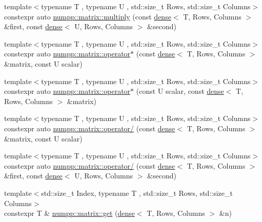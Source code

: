 \begin{DoxyCompactItemize}
\item 
{\footnotesize template$<$typename T , typename U , std\+::size\+\_\+t Rows, std\+::size\+\_\+t Columns$>$ }\\constexpr auto \hyperlink{group__numpp__structures__matrices__dense_gaeaace68ab41170931eb69e1cdb4fa381}{numpp\+::matrix\+::multiply} (const \hyperlink{classnumpp_1_1matrix_1_1dense}{dense}$<$ T, Rows, Columns $>$ \&first, const \hyperlink{classnumpp_1_1matrix_1_1dense}{dense}$<$ U, Rows, Columns $>$ \&second)
\item 
{\footnotesize template$<$typename T , typename U , std\+::size\+\_\+t Rows, std\+::size\+\_\+t Columns$>$ }\\constexpr auto \hyperlink{group__numpp__structures__matrices__dense_ga4ba3829a99216c5210cd95f49b703cf0}{numpp\+::matrix\+::operator$\ast$} (const \hyperlink{classnumpp_1_1matrix_1_1dense}{dense}$<$ T, Rows, Columns $>$ \&matrix, const U scalar)
\item 
{\footnotesize template$<$typename T , typename U , std\+::size\+\_\+t Rows, std\+::size\+\_\+t Columns$>$ }\\constexpr auto \hyperlink{group__numpp__structures__matrices__dense_ga6eabf8b5b95a1aeea6b7dc2e4344619e}{numpp\+::matrix\+::operator$\ast$} (const U scalar, const \hyperlink{classnumpp_1_1matrix_1_1dense}{dense}$<$ T, Rows, Columns $>$ \&matrix)
\item 
{\footnotesize template$<$typename T , typename U , std\+::size\+\_\+t Rows, std\+::size\+\_\+t Columns$>$ }\\constexpr auto \hyperlink{group__numpp__structures__matrices__dense_ga47bac473f5d6fe8ca8e085f8897d3f81}{numpp\+::matrix\+::operator/} (const \hyperlink{classnumpp_1_1matrix_1_1dense}{dense}$<$ T, Rows, Columns $>$ \&matrix, const U scalar)
\item 
{\footnotesize template$<$typename T , typename U , std\+::size\+\_\+t Rows, std\+::size\+\_\+t Columns$>$ }\\constexpr auto \hyperlink{group__numpp__structures__matrices__dense_ga1a70f81ac03f3832f97467af1dd782fc}{numpp\+::matrix\+::operator/} (const \hyperlink{classnumpp_1_1matrix_1_1dense}{dense}$<$ T, Rows, Columns $>$ \&first, const \hyperlink{classnumpp_1_1matrix_1_1dense}{dense}$<$ U, Rows, Columns $>$ \&second)
\item 
{\footnotesize template$<$std\+::size\+\_\+t Index, typename T , std\+::size\+\_\+t Rows, std\+::size\+\_\+t Columns$>$ }\\constexpr T \& \hyperlink{group__numpp__structures__matrices__dense_gaa9d630e00d9adfc653c428dad39d1b56}{numpp\+::matrix\+::get} (\hyperlink{classnumpp_1_1matrix_1_1dense}{dense}$<$ T, Rows, Columns $>$ \&n)

\end{DoxyCompactItemize}
